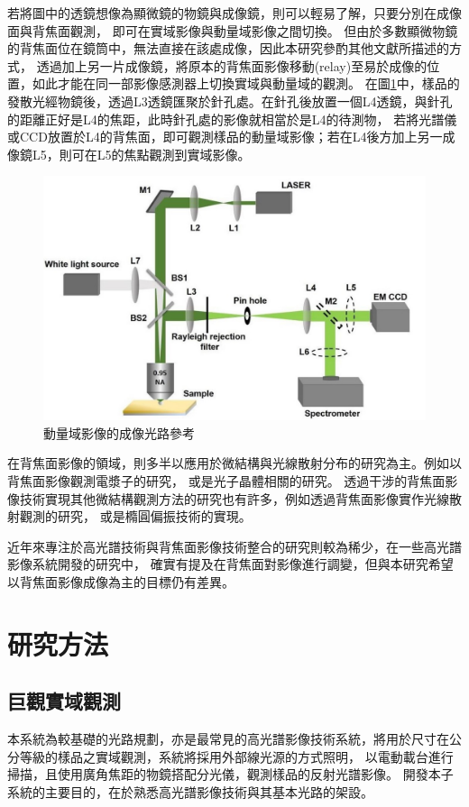\documentclass[12pt]{article}
\begin{document}
若將圖中的透鏡想像為顯微鏡的物鏡與成像鏡，則可以輕易了解，只要分別在成像面與背焦面觀測，
即可在實域影像與動量域影像之間切換。
但由於多數顯微物鏡的背焦面位在鏡筒中，無法直接在該處成像，因此本研究參酌其他文獻\cite{bfpimage}所描述的方式，
透過加上另一片成像鏡，將原本的背焦面影像移動(relay)至易於成像的位置，如此才能在同一部影像感測器上切換實域與動量域的觀測。
在圖\ref{path}中，樣品的發散光經物鏡後，透過L3透鏡匯聚於針孔處。在針孔後放置一個L4透鏡，與針孔的距離正好是L4的焦距，此時針孔處的影像就相當於是L4的待測物，
若將光譜儀或CCD放置於L4的背焦面，即可觀測樣品的動量域影像；若在L4後方加上另一成像鏡L5，則可在L5的焦點觀測到實域影像。
\begin{figure}[h]
    \centering
    \includegraphics[width=\linewidth]{bfppath.jpg}
    \caption{動量域影像的成像光路參考\cite{bfpimage}}
    \label{path}
\end{figure}

在背焦面影像的領域，則多半以應用於微結構與光線散射分布的研究為主。例如以背焦面影像觀測電漿子的研究，
或是光子晶體相關的研究\cite{hartmann2013radiation,zhang2014back,wagner2012back}。
透過干涉的背焦面影像技術實現其他微結構觀測方法的研究也有許多，例如透過背焦面影像實作光線散射觀測的研究\cite{davidson2006interferometric}，
或是橢圓偏振技術的實現\cite{feke1998interferometric}。

近年來專注於高光譜技術與背焦面影像技術整合的研究則較為稀少，在一些高光譜影像系統開發的研究中，
確實有提及在背焦面對影像進行調變\cite{gao2010snapshot}，但與本研究希望以背焦面影像成像為主的目標仍有差異。
\section{研究方法}
\subsection{巨觀實域觀測} \label{macroreal}
本系統為較基礎的光路規劃，亦是最常見的高光譜影像技術系統，將用於尺寸在公分等級的樣品之實域觀測，系統將採用外部線光源的方式照明，
以電動載台進行掃描，且使用廣角焦距的物鏡搭配分光儀，觀測樣品的反射光譜影像。
開發本子系統的主要目的，在於熟悉高光譜影像技術與其基本光路的架設。
\end{document}
